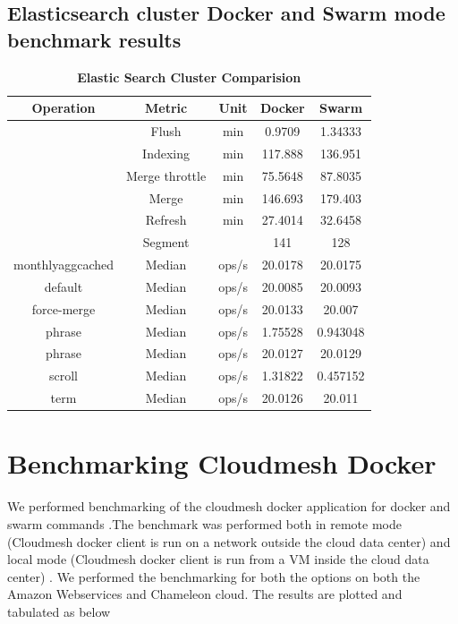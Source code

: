 \documentclass[9pt,twocolumn,twoside]{../../styles/osajnl}
\begin{document}
 \subsection{Elasticsearch cluster Docker and Swarm mode benchmark results}

     \begin{table}[h!]
     \caption{\bf Elastic Search Cluster Comparision }
     \begin{tabular}{ccccc}
     \hline
      Operation & Metric & Unit & Docker &Swarm\\
      \hline
       & Flush  & min & 0.9709 & 1.34333\\
       &Indexing & min   & 117.888 & 136.951\\
      &Merge throttle & min   & 75.5648 & 87.8035 \\
      & Merge          & min   & 146.693 & 179.403 \\
      &Refresh        & min   & 27.4014 & 32.6458 \\
      &Segment       &       & 141     & 128      \\
monthlyaggcached   & Median   & ops/s & 20.0178 & 20.0175 \\
default                      & Median   & ops/s & 20.0085 & 20.0093 \\
 force-merge            & Median   & ops/s & 20.0133 & 20.007   \\
phrase                      & Median   & ops/s & 1.75528 & 0.943048 \\
phrase                      & Median   & ops/s & 20.0127 & 20.0129  \\
scroll                        & Median   & ops/s & 1.31822 & 0.457152 \\
term                          & Median   & ops/s & 20.0126 & 20.011  \\
     \hline
     \end{tabular}
     \label{tab:tab1}
     \end{table}
     
 
\section{Benchmarking Cloudmesh Docker} 
We performed benchmarking of the cloudmesh docker application for docker and  swarm commands .The benchmark was performed both in remote mode (Cloudmesh docker client is run on a network outside the cloud data center) and local mode (Cloudmesh docker client is run from a VM  inside the cloud data center) . We
performed the benchmarking for both the options on both the Amazon Webservices\cite{www-AWS} and Chameleon cloud\cite{www-Chameleon}.
The results are plotted and tabulated as below
\end{document}
